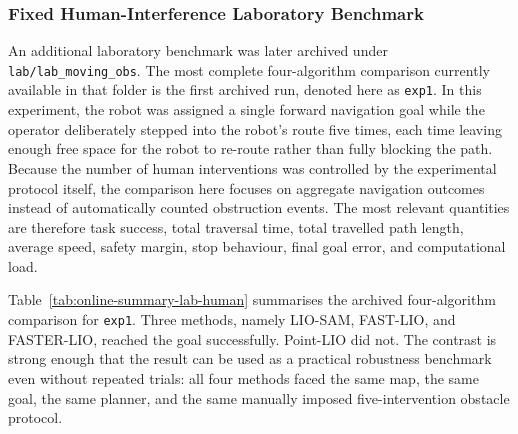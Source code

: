 \documentclass[12pt,a4paper]{report}
\begin{document}
\subsubsection{Fixed Human-Interference Laboratory Benchmark}
An additional laboratory benchmark was later archived under \texttt{lab/lab\_moving\_obs}. The most complete four-algorithm comparison currently available in that folder is the first archived run, denoted here as \texttt{exp1}. In this experiment, the robot was assigned a single forward navigation goal while the operator deliberately stepped into the robot's route five times, each time leaving enough free space for the robot to re-route rather than fully blocking the path. Because the number of human interventions was controlled by the experimental protocol itself, the comparison here focuses on aggregate navigation outcomes instead of automatically counted obstruction events. The most relevant quantities are therefore task success, total traversal time, total travelled path length, average speed, safety margin, stop behaviour, final goal error, and computational load.

Table~\ref{tab:online-summary-lab-human} summarises the archived four-algorithm comparison for \texttt{exp1}. Three methods, namely LIO-SAM, FAST-LIO, and FASTER-LIO, reached the goal successfully. Point-LIO did not. The contrast is strong enough that the result can be used as a practical robustness benchmark even without repeated trials: all four methods faced the same map, the same goal, the same planner, and the same manually imposed five-intervention obstacle protocol.

\begin{table}[H]
\centering
\scriptsize
\caption{Fixed human-interference indoor laboratory benchmark (\texttt{lab\_moving\_obs}, \texttt{exp1}) across all four algorithms. Each run used the same single-goal route and the same five planned human interventions.}
\label{tab:online-summary-lab-human}
\setlength{\tabcolsep}{3pt}
\renewcommand{\arraystretch}{1.05}
\end{table}
\end{document}
